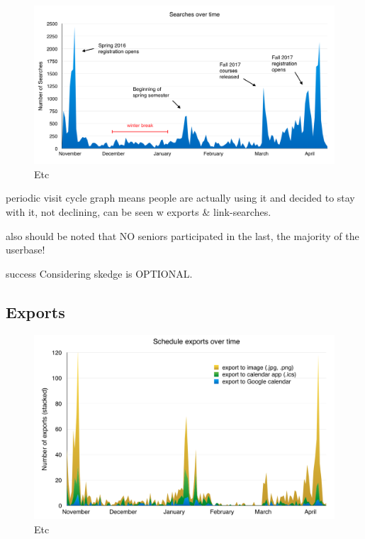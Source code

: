 \begin{figure}
  \centering

  \includegraphics[width=1.0\textwidth]{images/graph/searches}

  \caption{Etc}
  \label{fig:searches}

\end{figure}

periodic visit cycle graph means people are actually using it and decided to stay with it, not declining, can be seen w exports & link-searches.

also should be noted that NO seniors participated in the last, the majority of the userbase!

success Considering skedge is OPTIONAL.

\subsection{Exports}

\begin{figure}
  \centering
  \includegraphics[width=1.0\textwidth]{images/graph/exports}

  \caption{Etc}
  \label{fig:searchtypes}
\end{figure}


